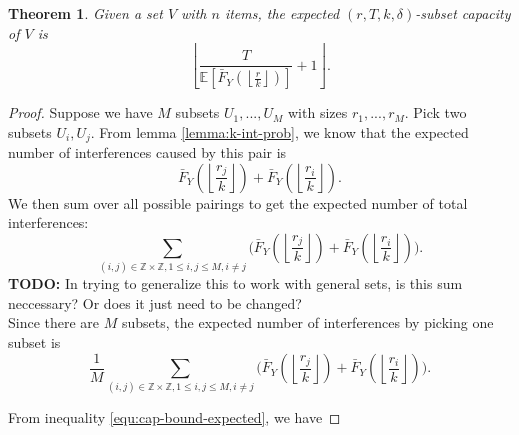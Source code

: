 \documentclass[10pt]{extarticle}
\newcommand{\Z}{\mathbb{Z}}
\newtheorem{theorem}{Theorem}
\theoremstyle{definition}
\begin{document}
\begin{theorem}
    Given a set $V$ with $n$ items, the expected $(r,T,k,\delta)$-subset capacity of $V$ is 
    \begin{equation*}
        \left\lfloor \frac{T}{\mathbb{E} \left[\bar{F}_Y\left(\left\lfloor \frac{r}{k} \right\rfloor\right)\right]} + 1 \right\rfloor.
    \end{equation*}
\end{theorem}

\begin{proof}
    Suppose we have $M$ subsets $U_1,...,U_M$ with sizes $r_1,...,r_M$. Pick two subsets $U_i,U_j$. From lemma \ref{lemma:k-int-prob}, we know that the expected number of interferences caused by this pair is
    $$
    \bar{F}_Y\left(\left\lfloor \frac{r_j}{k} \right\rfloor\right) + \bar{F}_Y\left(\left\lfloor \frac{r_i}{k} \right\rfloor\right).
    $$
    We then sum over all possible pairings to get the expected number of total interferences:
    $$
    \sum_{(i,j) \in \Z\times\Z, 1 \le i,j \le M, i \ne j} \Biggl( \bar{F}_Y\left(\left\lfloor \frac{r_j}{k} \right\rfloor\right) + \bar{F}_Y\left(\left\lfloor \frac{r_i}{k} \right\rfloor\right) \Biggr).
    $$
\textbf{TODO:} In trying to generalize this to work with general sets, is this sum neccessary? Or does it just need to be changed? \\

\noindent Since there are $M$ subsets, the expected number of interferences by picking one subset is
    $$
    \frac{1}{M} \sum_{(i,j) \in \Z\times\Z, 1 \le i,j \le M, i \ne j}  \Biggl( \bar{F}_Y\left(\left\lfloor \frac{r_j}{k} \right\rfloor\right) + \bar{F}_Y\left(\left\lfloor \frac{r_i}{k} \right\rfloor\right) \Biggr).
    $$

\noindent From inequality \ref{equ:cap-bound-expected}, we have 


\end{proof}
\end{document}
